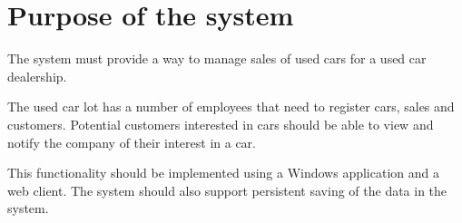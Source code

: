 \section{Purpose of the system}
The system must provide a way to manage sales of used cars for a used car dealership.

The used car lot has a number of employees that need to register cars, sales and customers. Potential customers interested in cars should be able to view and notify the company of their interest in a car. 

This functionality should be implemented using a Windows application and a web client. The system should also support persistent saving of the data in the system.
